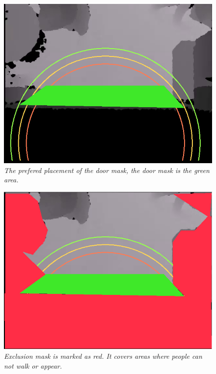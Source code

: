 \begin{figure}[H]
	\centering
	\includegraphics[width=\linewidth]{images/Manual3.png}
	\caption[Exclusion mask]{\textit{The prefered placement of the door mask, the door mask is the green area.}}
	\label{fig:doorMask}  %
\end{figure}

\begin{figure}[H]
	\centering
	\includegraphics[width=\linewidth]{images/Manual1.png}
	\caption[Exclusion mask]{\textit{Exclusion mask is marked as red. It covers areas where people can not walk or appear.}}
	\label{fig:exMask}  %
\end{figure}